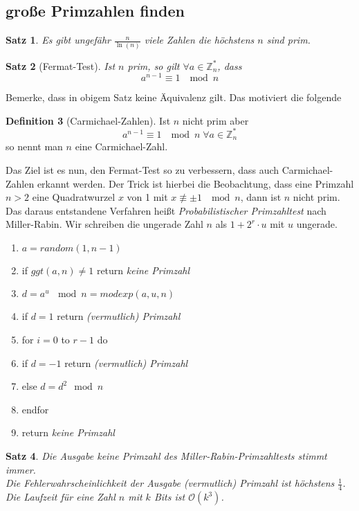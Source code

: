 \documentclass[a4paper, 12pt]{article}
\theoremstyle{plain}
\newtheorem{theorem}{Satz}[subsection] %
\theoremstyle{definition}
\newtheorem{definition}[theorem]{Definition} %
\theoremstyle{lemma}
\theoremstyle{remark}
\theoremstyle{corollary}
\theoremstyle{example}
\begin{document}
	\subsection{große Primzahlen finden}
	\begin{theorem}
		Es gibt ungefähr $\frac{n}{\ln(n)}$ viele Zahlen die höchstens $n$ sind prim.
	\end{theorem}
	\begin{theorem}[Fermat-Test]
		Ist $n$ prim, so gilt $\forall a \in \mathbb{Z}_n^*$, dass \[a^{n-1} \equiv 1 \; \mod n\]
	\end{theorem}
	Bemerke, dass in obigem Satz keine Äquivalenz gilt. Das motiviert die folgende
	\begin{definition}[Carmichael-Zahlen]
		Ist $n$ nicht prim aber \[a^{n-1} \equiv 1 \; \mod n \; \forall a \in \mathbb{Z}_n^*\] so nennt man $n$ eine Carmichael-Zahl.
	\end{definition}
	Das Ziel ist es nun, den Fermat-Test so zu verbessern, dass auch Carmichael-Zahlen erkannt werden. Der Trick ist hierbei die Beobachtung, dass eine Primzahl $n>2$ eine Quadratwurzel $x$ von 1 mit $x \not \equiv \pm 1 \; \mod n$, dann ist $n$ nicht prim. Das daraus entstandene Verfahren heißt \textit{Probabilistischer Primzahltest} nach Miller-Rabin. Wir schreiben die ungerade Zahl $n$ als $1+2^r\cdot u$ mit $u$ ungerade.
	\begin{enumerate}
		\item $a = random(1,n-1)$
		\item if $ggt(a,n) \neq 1$ return \textit{keine Primzahl}
		\item $d = a^u \, \mod n = modexp(a,u,n)$
		\item if $d=1$ return \textit{(vermutlich) Primzahl}
		\item for $i=0$ to $r-1$ do
		\item if $d=-1$ return \textit{(vermutlich) Primzahl}
		\item else $d=d^2 \mod n$
		\item endfor
		\item return \textit{keine Primzahl}
	\end{enumerate}
	\begin{theorem}
		Die Ausgabe \textit{keine Primzahl} des Miller-Rabin-Primzahltests stimmt immer.\\
		Die Fehlerwahrscheinlichkeit der Ausgabe \textit{(vermutlich) Primzahl} ist höchstens $\frac{1}{4}$. Die Laufzeit für eine Zahl $n$ mit $k$ Bits ist $\mathcal{O}(k^3)$.
	\end{theorem}
\end{document}
